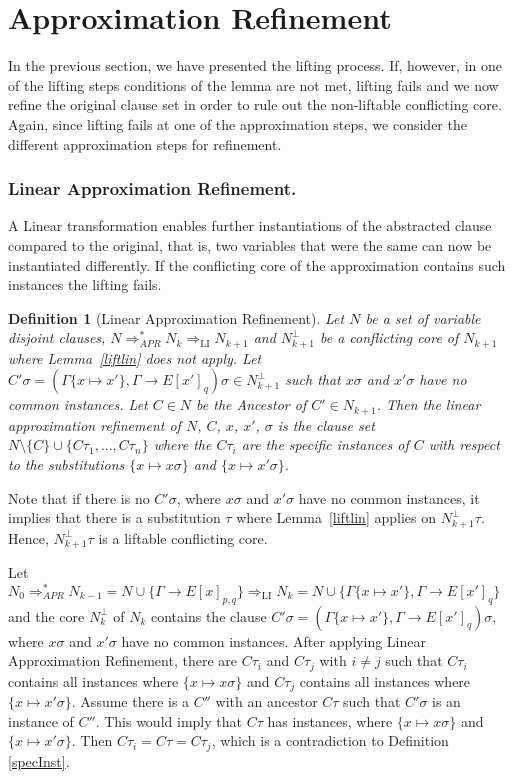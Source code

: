 \documentclass{llncs}
\newcommand{\imp}{\rightarrow}
\newcommand{\apr}{ \Rightarrow_{APR}}
\newtheorem{defin}{Definition}
\begin{document}
\section{Approximation Refinement}\label{abstrref}

In the previous section, we have presented the lifting process.
If, however, in one of the lifting steps  conditions of the lemma are not met, lifting fails and 
we now refine the original clause set in order to rule out the non-liftable conflicting core.
Again, since lifting fails at one of the approximation steps, we consider the different
approximation steps for refinement.


\subsubsection{Linear Approximation Refinement.}
A Linear transformation
enables further instantiations of the abstracted clause compared to the original, 
that is, two variables that were the same can now be instantiated differently. 
If the conflicting core of the approximation contains such instances the lifting fails.

\begin{defin}[Linear Approximation Refinement]
Let $N$ be a set of variable disjoint clauses, 
$N\apr^* N_k \Rightarrow_{\text{LI}} N_{k+1}$ and
$N^\bot_{k+1}$ be a conflicting core of $N_{k+1}$ where Lemma~\ref{liftlin} does not apply.
Let $C'\sigma=(\Gamma\{x \mapsto x'\},\Gamma \imp E[x']_q)\sigma \in N^\bot_{k+1}$
 such that $x\sigma$ and $ x'\sigma$ have no common instances. 
Let $C\in N$ be the Ancestor of $C'\in N_{k+1}$.
Then the \emph{linear approximation refinement} of $N$, $C$, $x$, $x'$, $\sigma$ is the clause
set $N\setminus\{C\}\cup\{C\tau_1,\ldots,C\tau_n\}$ where the $C\tau_i$ are the specific
instances of $C$ with respect to the substitutions $\{x\mapsto x\sigma\}$ and
$\{x\mapsto x'\sigma\}$.
\end{defin}

Note that if there is no $C'\sigma$, where $x\sigma$ and $ x'\sigma$ have no common instances, 
it implies that there is a substitution $\tau$
where Lemma~\ref{liftlin} applies on $N^\bot_{k+1}\tau$. Hence, $N^\bot_{k+1}\tau$ is a liftable
conflicting core.

Let $N_0\apr^* N_{k-1}= N\cup\{\Gamma \imp E[x]_{p,q}\} \Rightarrow_{\text{LI}} N_{k}= N\cup\{\Gamma\{x \mapsto x'\},\Gamma \imp E[x']_q\}$
and the core $N^\bot_k$ of $N_k$ contains the clause $C'\sigma=(\Gamma\{x \mapsto x'\},\Gamma \imp E[x']_q)\sigma$, where $x\sigma$ and $x'\sigma$ have no common instances.
After applying Linear Approximation Refinement, there are $C\tau_i$ and $ C\tau_j$ with $i\neq j$ such that  $C\tau_i$ contains all instances where $\{x \mapsto x\sigma \}$
and $C\tau_j$ contains all instances where $\{x \mapsto x'\sigma \}$. 
Assume there is a $C''$ with an ancestor $C\tau$ such that $C'\sigma$ is an instance of $C''$.
This would imply that $C\tau$ has instances, where $\{x \mapsto x\sigma\} $ and $\{x \mapsto x'\sigma\} $.
Then $C\tau_i= C\tau= C\tau_j$, which is a contradiction to Definition \ref{specInst}. 
\end{document}
